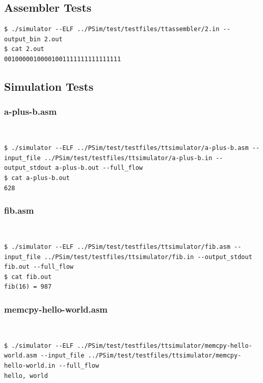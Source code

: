 \documentclass[conference, draftclsnofoot, letterpaper]{IEEETran}
\begin{document}
\subsection{Assembler Tests}

\begin{lstlisting}[language={}]
$ ./simulator --ELF ../PSim/test/testfiles/ttassembler/2.in --output_bin 2.out
$ cat 2.out
00100000100001001111111111111111
\end{lstlisting}

\subsection{Simulation Tests}

\subsubsection{a-plus-b.asm}

~\
\begin{lstlisting}[language={}]
$ ./simulator --ELF ../PSim/test/testfiles/ttsimulator/a-plus-b.asm --input_file ../PSim/test/testfiles/ttsimulator/a-plus-b.in --output_stdout a-plus-b.out --full_flow
$ cat a-plus-b.out
628
\end{lstlisting}

\subsubsection{fib.asm}

~\
\begin{lstlisting}[language={}]
$ ./simulator --ELF ../PSim/test/testfiles/ttsimulator/fib.asm --input_file ../PSim/test/testfiles/ttsimulator/fib.in --output_stdout fib.out --full_flow
$ cat fib.out
fib(16) = 987
\end{lstlisting}

\subsubsection{memcpy-hello-world.asm}

~\
\begin{lstlisting}[language={}]
$ ./simulator --ELF ../PSim/test/testfiles/ttsimulator/memcpy-hello-world.asm --input_file ../PSim/test/testfiles/ttsimulator/memcpy-hello-world.in --full_flow
hello, world
\end{lstlisting}
\end{document}
